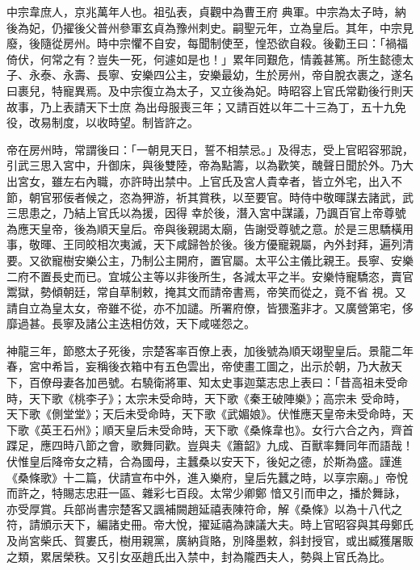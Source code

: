 \begin{pinyinscope}
 中宗韋庶人，京兆萬年人也。祖弘表，貞觀中為曹王府
 典軍。中宗為太子時，納後為妃，仍擢後父普州參軍玄貞為豫州刺史。嗣聖元年，立為皇后。其年，中宗見廢，後隨從房州。時中宗懼不自安，每聞制使至，惶恐欲自殺。後勸王曰：「禍福倚伏，何常之有？豈失一死，何遽如是也！」累年同艱危，情義甚篤。所生懿德太子、永泰、永壽、長寧、安樂四公主，安樂最幼，生於房州，帝自脫衣裹之，遂名曰裹兒，特寵異焉。及中宗復立為太子，又立後為妃。時昭容上官氏常勸後行則天故事，乃上表請天下士庶
 為出母服喪三年；又請百姓以年二十三為丁，五十九免役，改易制度，以收時望。制皆許之。



 帝在房州時，常謂後曰：「一朝見天日，誓不相禁忌。」及得志，受上官昭容邪說，引武三思入宮中，升御床，與後雙陸，帝為點籌，以為歡笑，醜聲日聞於外。乃大出宮女，雖左右內職，亦許時出禁中。上官氏及宮人貴幸者，皆立外宅，出入不節，朝官邪佞者候之，恣為狎游，祈其賞秩，以至要官。時侍中敬暉謀去諸武，武三思患之，乃結上官氏以為援，因得
 幸於後，潛入宮中謀議，乃諷百官上帝尊號為應天皇帝，後為順天皇后。帝與後親謁太廟，告謝受尊號之意。於是三思驕橫用事，敬暉、王同皎相次夷滅，天下咸歸咎於後。後方優寵親屬，內外封拜，遍列清要。又欲寵樹安樂公主，乃制公主開府，置官屬。太平公主儀比親王。長寧、安樂二府不置長史而已。宜城公主等以非後所生，各減太平之半。安樂恃寵驕恣，賣官鬻獄，勢傾朝廷，常自草制敕，掩其文而請帝書焉，帝笑而從之，竟不省
 視。又請自立為皇太女，帝雖不從，亦不加譴。所署府僚，皆猥濫非才。又廣營第宅，侈靡過甚。長寧及諸公主迭相仿效，天下咸嗟怨之。



 神龍三年，節愍太子死後，宗楚客率百僚上表，加後號為順天翊聖皇后。景龍二年春，宮中希旨，妄稱後衣箱中有五色雲出，帝使畫工圖之，出示於朝，乃大赦天下，百僚母妻各加邑號。右驍衛將軍、知太史事迦葉志忠上表曰：「昔高祖未受命時，天下歌《桃李子》；太宗未受命時，天下歌《秦王破陣樂》；高宗未
 受命時，天下歌《側堂堂》；天后未受命時，天下歌《武媚娘》。伏惟應天皇帝未受命時，天下歌《英王石州》；順天皇后未受命時，天下歌《桑條韋也》。女行六合之內，齊首蹀足，應四時八節之會，歌舞同歡。豈與夫《簫韶》九成、百獸率舞同年而語哉！伏惟皇后降帝女之精，合為國母，主蠶桑以安天下，後妃之德，於斯為盛。謹進《桑條歌》十二篇，伏請宣布中外，進入樂府，皇后先蠶之時，以享宗廟。」帝悅而許之，特賜志忠莊一區、雜彩七百段。太常少卿鄭
 愔又引而申之，播於舞詠，亦受厚賞。兵部尚書宗楚客又諷補闕趙延禧表陳符命，解《桑條》以為十八代之符，請頒示天下，編諸史冊。帝大悅，擢延禧為諫議大夫。時上官昭容與其母鄭氏及尚宮柴氏、賀婁氏，樹用親黨，廣納貨賂，別降墨敕，斜封授官，或出臧獲屠販之類，累居榮秩。又引女巫趙氏出入禁中，封為隴西夫人，勢與上官氏為比。




\end{pinyinscope}
